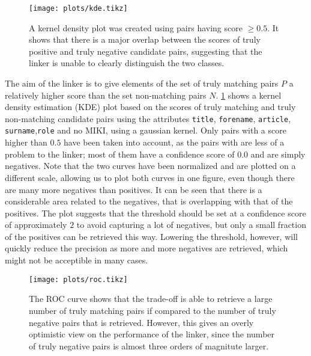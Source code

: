 \begin{figure}
    \centering
    \texttt{[image: plots/kde.tikz]}
    \caption{A kernel density plot was created using pairs having score $\geq 0.5$. It shows that there is a major overlap between the scores of truly positive and truly negative candidate pairs, suggesting that the linker is unable to clearly distinguish the two classes.}
    \label{fig:kde}
\end{figure}

The aim of the linker is to give elements of the set of truly matching pairs $P$ a relatively higher score than the set non-matching pairs $N$.
\cref{fig:kde} shows a kernel density estimation (KDE) plot based on the scores of truly matching and truly non-matching candidate pairs using the attributes \texttt{title}, \texttt{forename}, \texttt{article}, \texttt{surname},\texttt{role} and no MIKI, using a gaussian kernel.
Only pairs with a score higher than $0.5$ have been taken into account, as the pairs with are less of a problem to the linker; most of them have a confidence score of $0.0$ and are simply negatives.
Note that the two curves have been normalized and are plotted on a different scale, allowing us to plot both curves in one figure, even though there are many more negatives than positives.
It can be seen that there is a considerable area related to the negatives, that is overlapping with that of the positives.
The plot suggests that the threshold should be set at a confidence score of approximately $2$ to avoid capturing a lot of negatives, but only a small fraction of the positives can be retrieved this way.
Lowering the threshold, however, will quickly reduce the precision as more and more negatives are retrieved, which might not be acceptible in many cases.

\begin{figure}
    \centering
    \texttt{[image: plots/roc.tikz]}
    \caption{The ROC curve shows that the trade-off is able to retrieve a large number of truly matching pairs if compared to the number of truly negative pairs that is retrieved. However, this gives an overly optimistic view on the performance of the linker, since the number of truly negative pairs is almost three orders of magnitute larger.}
    \label{fig:roc}
\end{figure}

